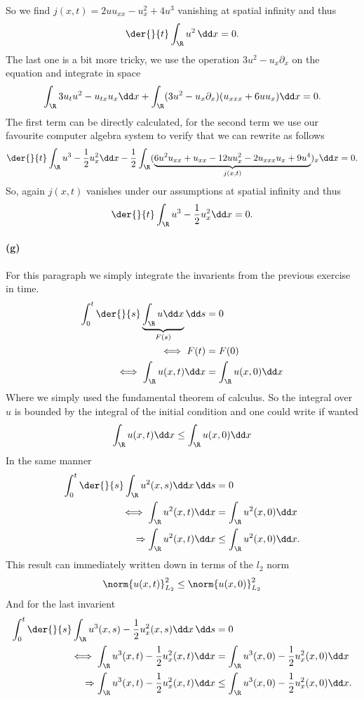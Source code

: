 So we find $j(x,t)=2uu_{xx}-u_x^2 + 4u^3$ vanishing at spatial infinity and thus 
\begin{align}
\der{}{t}\int_\R u^2\, \dd x= 0.
\end{align}
The last one is a bit more tricky, we use the operation $3u^2-u_x\partial_x$ on the equation and integrate in space 
\begin{align}
\int_\R3u_t u^2 - u_{tx}u_x\dd x +\int_\R(3u^2-u_x\partial_x)(u_{xxx} +6uu_x)\dd x =0.
\end{align}
The first term can be directly calculated, for the second term we use our favourite computer algebra system to verify that we can rewrite as follows
\begin{align}
\der{}{t}\int_\R u^3 -\frac 12 u_x^2 \dd x -\frac 12\int_\R(\underbrace{6u^2u_{xx}+u_{xx}-12uu_x^2-2u_{xxx}u_x+9u^4}_{j(x,t)})_x\dd x = 0.
\end{align}
So, again $j(x,t)$ vanishes under our assumptions at spatial infinity and thus
\begin{align}
\der{}{t}\int_\R u^3 -\frac 12 u_x^2 \dd x  = 0.
\end{align}
\paragraph{(g)}
For this paragraph we simply integrate the invarients from the previous exercise in time. 
\begin{align}
\int_0^t \der{}{s}\underbrace{\int_\R u\dd x}_{F(s)}\dd s &= 0\\
\iff F(t) &= F(0)\\
\iff \int_\R u(x,t)\dd x&=\int_\R u(x,0) \dd x
\end{align}
Where we simply used the fundamental theorem of calculus. So the integral over $u$ is bounded by the integral of the initial condition and one could write if wanted
\begin{align}
\int_\R u(x,t)\dd x\leq\int_\R u(x,0) \dd x
\end{align}
In the same manner
\begin{align}
\int_0^t \der{}{s}\int_\R u^2(x,s)\dd x\, \dd s& =0\\
\iff \int_\R u^2(x,t)\dd x &= \int_\R u^2(x,0)\dd x \\
\Rightarrow \int_\R u^2(x,t)\dd x &\leq \int_\R u^2(x,0)\dd x .
\end{align}
This result can immediately written down in terms of the $l_2$ norm
\begin{align}
\norm{u(x,t)}^2_{L_2}\leq \norm{u(x,0)}^2_{L_2}
\end{align}
And for the last invarient
\begin{align}
\int_0^t \der{}{s}\int_\R u^3(x,s)-\frac 12 u_x^2(x,s)\dd x\, \dd s& =0\\
\iff \int_\R u^3(x,t)-\frac 12 u_x^2(x,t)\dd x &= \int_\R u^3(x,0)-\frac 12 u_x^2(x,0)\dd x \\
\Rightarrow \int_\R u^3(x,t)-\frac 12 u_x^2(x,t)\dd x &\leq \int_\R u^3(x,0)-\frac 12 u_x^2(x,0)\dd x.
\end{align}